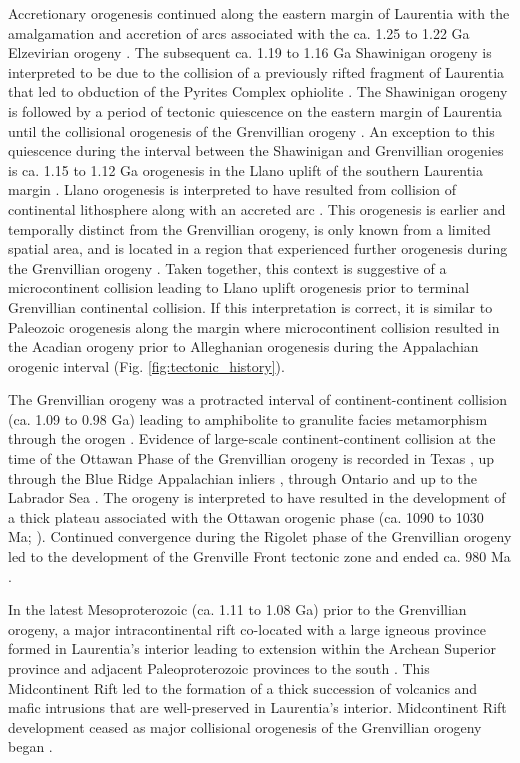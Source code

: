 \documentclass[twocolumn, switch]{article} %
\begin{document}
Accretionary orogenesis continued along the eastern margin of Laurentia with the amalgamation and accretion of arcs associated with the ca. 1.25 to 1.22 Ga Elzevirian orogeny \citep{McLelland2013a}. The subsequent ca. 1.19 to 1.16 Ga Shawinigan orogeny is interpreted to be due to the collision of a previously rifted fragment of Laurentia that led to obduction of the Pyrites Complex ophiolite \citep{McLelland2010a, Chiarenzelli2011a}. The Shawinigan orogeny is followed by a period of tectonic quiescence on the eastern margin of Laurentia until the collisional orogenesis of the Grenvillian orogeny \citep{McLelland2010a}. An exception to this quiescence during the interval between the Shawinigan and Grenvillian orogenies is ca. 1.15 to 1.12 Ga orogenesis in the Llano uplift of the southern Laurentia margin \citep{Mosher1998a}. Llano orogenesis is interpreted to have resulted from collision of continental lithosphere along with an accreted arc \citep{Mosher1998a}. This orogenesis is earlier and temporally distinct from the Grenvillian orogeny, is only known from a limited spatial area, and is located in a region that experienced further orogenesis during the Grenvillian orogeny \citep{Grimes2004a}. Taken together, this context is suggestive of a microcontinent collision leading to Llano uplift orogenesis prior to terminal Grenvillian continental collision. If this interpretation is correct, it is similar to Paleozoic orogenesis along the margin where microcontinent collision resulted in the Acadian orogeny prior to Alleghanian orogenesis during the Appalachian orogenic interval (Fig. \ref{fig:tectonic_history}).

The Grenvillian orogeny was a protracted interval of continent-continent collision (ca. 1.09 to 0.98 Ga) leading to amphibolite to granulite facies metamorphism through the orogen \citep{McLelland2010a}. Evidence of large-scale continent-continent collision at the time of the Ottawan Phase of the Grenvillian orogeny is recorded in Texas \citep{Grimes2004a}, up through the Blue Ridge Appalachian inliers \citep{Johnson2020a}, through Ontario and up to the Labrador Sea \citep{Rivers2008a}. The orogeny is interpreted to have resulted in the development of a thick plateau associated with the Ottawan orogenic phase (ca. 1090 to 1030 Ma; \citealp{Rivers2008a}). Continued convergence during the Rigolet phase of the Grenvillian orogeny led to the development of the Grenville Front tectonic zone and ended ca. 980 Ma \citep{Hynes2010a}.

In the latest Mesoproterozoic (ca. 1.11 to 1.08 Ga) prior to the Grenvillian orogeny, a major intracontinental rift co-located with a large igneous province formed in Laurentia's interior leading to extension within the Archean Superior province and adjacent Paleoproterozoic provinces to the south \citep{Cannon1992b}. This Midcontinent Rift led to the formation of a thick succession of volcanics and mafic intrusions that are well-preserved in Laurentia's interior. Midcontinent Rift development ceased as major collisional orogenesis of the Grenvillian orogeny began \citep{Cannon1994a, Swanson-Hysell2019a}.
\end{document}
